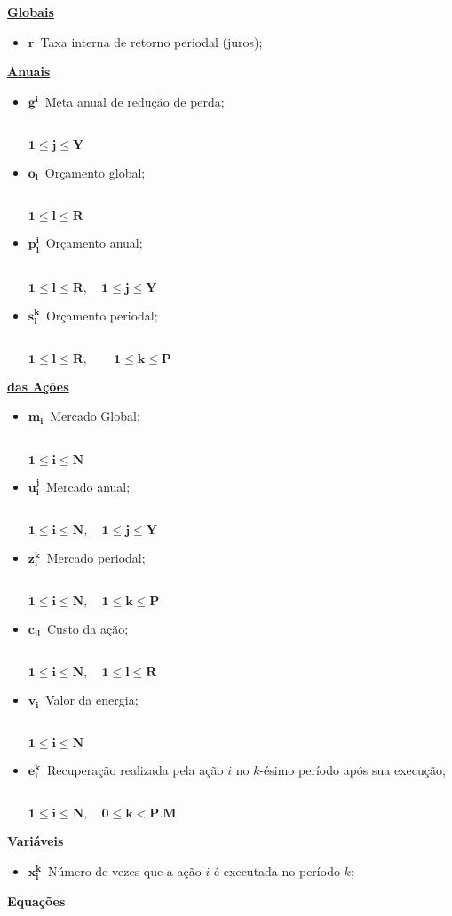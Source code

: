 \documentclass{article}
\newcommand{\topico}[1]{
  \vspace{20pt}
  {\Large \bf #1 }
}
\newcommand{\subtopico}[1]{
  {\large \bf \underline{#1}}
  \\
}
\newcommand{\variavel}[1]{
  { \Large $ \bm{ #1 } \, $}
}
\newcommand{\decorator}[1]{
  {\\ \scriptsize \hspace*{12pt} $ \bm{ #1 } $ }
}
\begin{document}
\begin{multicols}{2}

\subtopico{Globais}
\begin{itemize}
  \item \variavel{r} Taxa interna de retorno periodal (juros);
\end{itemize}

\subtopico{Anuais}
\begin{itemize}
  \item \variavel{g^i} Meta anual de redução de perda;
    \decorator{1 \leq j \leq Y}
  \item \variavel{o_l} Orçamento global;
    \decorator{1 \leq l \leq R}
  \item \variavel{p_l^i} Orçamento anual;
    \decorator{1 \leq l \leq R, \quad 1 \leq j \leq Y}
  \item \variavel{s_l^{k}} Orçamento periodal;
    \decorator{1 \leq l \leq R, \quad \quad 1 \leq k \leq P}
\end{itemize}

\vfill \columnbreak

\subtopico{das Ações}
\begin{itemize}
  \item \variavel{m_i} Mercado Global;
    \decorator{1 \leq i \leq N}
  \item \variavel{u_i^j} Mercado anual;
    \decorator{1 \leq i \leq N, \quad 1 \leq j \leq Y}
  \item \variavel{z_i^k} Mercado periodal;
    \decorator{1 \leq i \leq N, \quad 1 \leq k \leq P}
  \item \variavel{c_{il}} Custo da ação;
    \decorator{1 \leq i \leq N, \quad 1 \leq l \leq R}
  \item \variavel{v_i} Valor da energia;
    \decorator{1 \leq i \leq N}
  \item \variavel{e_i^k} Recuperação realizada pela ação $i$ no $k$-ésimo período
    após sua execução;
    \decorator{1 \leq i \leq N, \quad 0 \leq k < P.M}
\end{itemize}

\end{multicols}

\pagebreak

\topico{Variáveis}
\begin{itemize}
  \item \variavel{x_i^k} Número de vezes que a ação $i$ é executada no período $k$;
\end{itemize}

\topico{Equações}
\end{document}
